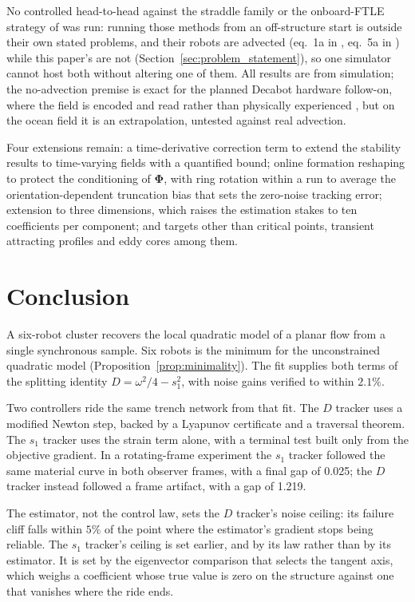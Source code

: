 \documentclass[lettersize,journal]{IEEEtran}
\begin{document}
No controlled head-to-head against the straddle family \cite{17,18,19} or
the onboard-FTLE strategy of \cite{21} was run: running those methods
from an off-structure start is outside their own stated problems, and
their robots are advected (eq.~1a in \cite{17}, eq.~5a in \cite{21})
while this paper's are not (Section~\ref{sec:problem_statement}), so
one simulator cannot host both without altering one of them. All
results are from simulation; the no-advection premise is exact for the
planned Decabot hardware follow-on, where the field is encoded and read
rather than physically experienced \cite{39}, but on the ocean field it
is an extrapolation, untested against real advection.

Four extensions remain: a time-derivative correction term to extend the
stability results to time-varying fields with a quantified bound; online
formation reshaping to protect the conditioning of
$\boldsymbol{\Phi}$, with ring rotation within a run to average the
orientation-dependent truncation bias that sets the zero-noise tracking
error; extension to three dimensions, which raises the estimation stakes
to ten coefficients per component; and targets other than critical
points, transient attracting profiles and eddy cores among them.



\section{Conclusion}
\label{sec:conclusion}


A six-robot cluster recovers the local
quadratic model of a planar flow from a single synchronous sample.
Six robots is the minimum for the unconstrained quadratic model
(Proposition~\ref{prop:minimality}). The fit supplies both terms of the
splitting identity $D = \omega^2/4 - s_1^2$, with noise gains verified
to within $2.1\%$.

Two controllers ride the same trench network from that fit. The $D$
tracker uses a modified Newton step, backed by a Lyapunov certificate
and a traversal theorem. The $s_1$ tracker uses the strain term alone,
with a terminal test built only from the objective gradient. In a
rotating-frame experiment the $s_1$ tracker followed the same material
curve in both observer frames, with a final gap of 0.025; the $D$
tracker instead followed a frame artifact, with a gap of 1.219.

The estimator, not the control law, sets the $D$ tracker's noise
ceiling: its failure cliff falls within $5\%$ of the point where the
estimator's gradient stops being reliable. The $s_1$ tracker's ceiling
is set earlier, and by its law rather than by its estimator. It is set
by the eigenvector comparison that selects the tangent axis, which
weighs a coefficient whose true value is zero on the structure against
one that vanishes where the ride ends.
\end{document}
